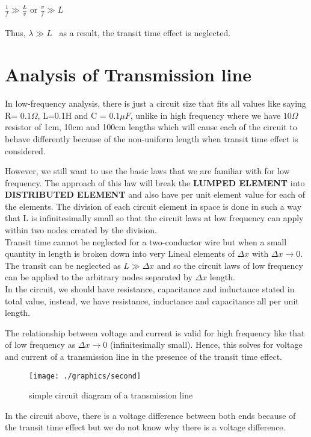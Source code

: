 $ \frac{1}{f} \gg \frac{L}{v} $ or $ \frac{v}{f} \gg L $ \\\\
Thus, $ \lambda \gg L $ \ as a result, the transit time effect is neglected.

\section{Analysis of Transmission line}
In low-frequency analysis, there is just a circuit size that fits all values like saying R= $ 0.1\Omega $, L=0.1H and C = $ 0.1\mu F $, unlike in high frequency where we have $ 10\Omega $ resistor of 1cm, 10cm and 100cm lengths which will cause each of the circuit to behave differently because of the non-uniform length when transit time effect is considered.

However, we still want to use the basic laws that we are familiar with for low frequency. The approach of this law will break the\textbf{ LUMPED ELEMENT} into \textbf{DISTRIBUTED ELEMENT} and also have per unit element value for each of the elements. The division of each circuit element in space is done in such a way that L is infinitesimally small so that the circuit laws at low frequency can apply within two nodes created by the division.\\

Transit time cannot be neglected for a two-conductor wire but when a small quantity in length is broken down into very Lineal elements of $ \Delta x $ with  $  \Delta x \rightarrow 0 $. The transit can be neglected as $ L \gg \Delta x $ and so the circuit laws of low frequency can be applied to the arbitrary nodes separated by $ \Delta x $ length. \\
In the circuit, we should have resistance, capacitance and inductance stated in total value, instead, we have resistance, inductance and capacitance all per unit length.

The relationship between voltage and current is valid for high frequency like that of low frequency as $ \Delta x  \rightarrow 0$ (infinitesimally small). Hence, this solves for voltage and current of a transmission line in the presence of the transit time effect.\\
\begin{figure}[h]
\centering
\texttt{[image: ./graphics/second]}
\caption{simple circuit diagram of a transmission line}
\end{figure}	

In the circuit above, there is a voltage difference between both ends because of the transit time effect but we do not know why there is a voltage difference.

